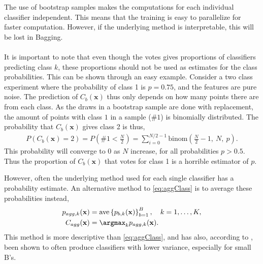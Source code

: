 The use of bootstrap samples makes the computations for each individual classifier independent. This means that the training is easy to parallelize for faster computation. However, if the underlying method is interpretable, this will be lost in Bagging.
\\
\\
It is important to note that even though the votes gives proportions of classifiers predicting class $k$, these proportions should not be used as estimates for the class probabilities. This can be shown through an easy example. Consider a two class experiment where the probability of class 1 is $p = 0.75$, and the features are pure noise. The prediction of $C_b(\mathbf{x})$ thus only depends on how many points there are from each class. As the draws in a bootstrap sample are done with replacement, the amount of points with class $1$ in a sample ($\# 1$) is binomially distributed. The probability that $C_b(\mathbf{x})$ gives class 2 is thus, 
\begin{align}
  P(C_b(\mathbf{x})=2) = P\left(\#1 <  \frac{N}{2} \right) = \sum_{i = 0}^{N/2 - 1} \mathrm{binom}\left(\frac{N}{2}-1,\: N,\: p  \right).
\end{align}
This probability will converge to 0 as $N$ increase, for all probabilities $p > 0.5$. Thus the proportion of $C_b(\mathbf{x})$ that votes for class 1 is a horrible estimator of $p$.

However, often the underlying method used for each single classifier has a probability estimate. An alternative method to \eqref{eq:aggClass} is to average these probabilities instead,
\begin{align}
  p_{agg, k}(\mathbf{x}) &=  \mathrm{ave}\left\{ p_{b, k}(\mathbf{x}) \right\}_{b = 1}^{B}, \quad k = 1, \ldots, K, \\
  \label{eq:aggClassP} 
  C_{agg}(\mathbf{x}) &= \argmax_k p_{agg, k}(\mathbf{x}).
\end{align}
This method is more descriptive than \eqref{eq:aggClass}, and has also, according to \cite{modstat}, been shown to often produce classifiers with lower variance, especially for small B's.

